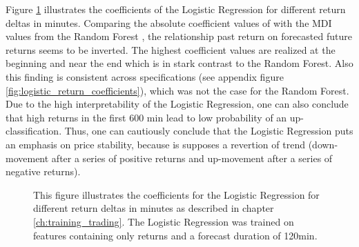 Figure \ref{fig:logistic_return_coefficients_no_volume_120min} illustrates the coefficients of the Logistic Regression 
for different return deltas in minutes. Comparing the absolute coefficient values of with the MDI values 
from the Random Forest \cite{louppe2015variableImportance}, the relationship past return on forecasted future returns seems to be inverted. 
The highest coefficient values are realized at the beginning and near the end which is
in stark contrast to the Random Forest. Also this finding is consistent across specifications (see appendix figure \ref{fig:logistic_return_coefficients}), 
which was not the case for the Random Forest.
Due to the high interpretability of the Logistic Regression, 
one can also conclude that high returns in the first 600 min lead to low probability of an up-classification.
Thus, one can cautiously conclude that the Logistic Regression puts an emphasis on price stability, 
because is supposes a revertion of trend (down-movement after a series of positive returns and up-movement after a series of negative returns).



\begin{figure}[H]
    \captionsetup{format=plain}
    \caption{ 
            This figure illustrates the coefficients for the Logistic Regression 
            for different return deltas in minutes as described in chapter \ref{ch:training_trading}.
            The Logistic Regression was trained on features containing only returns and a forecast duration of 120min.
        }
    \label{fig:logistic_return_coefficients_no_volume_120min}
\end{figure}
